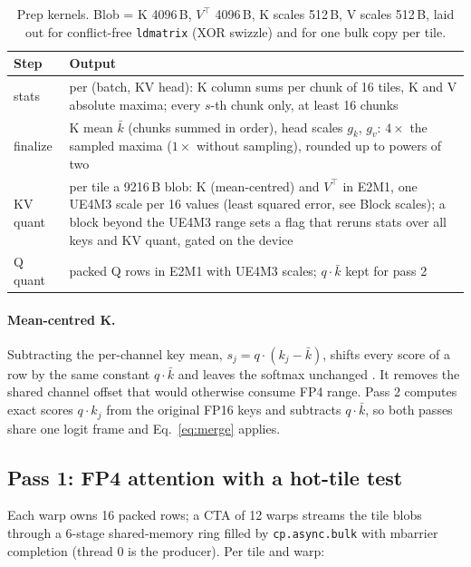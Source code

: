 \documentclass[10pt,twocolumn]{article}
\newcommand{\code}[1]{\texttt{#1}}
\begin{document}
\begin{table}[t]
\centering\small
\begin{tabular}{@{}lp{}@{}}
\toprule
Step & Output \\
\midrule
stats & per (batch, KV head): K column sums per chunk of 16 tiles, K and V absolute maxima; every $s$-th chunk
  only, at least 16 chunks \\
finalize & K mean $\bar k$ (chunks summed in order), head scales $g_k$, $g_v$: $4\times$ the sampled maxima ($1\times$
  without sampling), rounded up to powers of two \\
KV quant & per tile a 9216\,B blob: K (mean-centred) and $V^\top$ in E2M1, one UE4M3 scale per 16 values (least
  squared error, see Block scales); a block beyond the UE4M3 range sets a flag that reruns stats over all
  keys and KV quant, gated on the device \\
Q quant & packed Q rows in E2M1 with UE4M3 scales; $q\cdot\bar k$ kept for pass 2 \\
\bottomrule
\end{tabular}
\caption{Prep kernels. Blob = K 4096\,B, $V^\top$ 4096\,B, K scales 512\,B, V scales 512\,B, laid out for
conflict-free \code{ldmatrix} (XOR swizzle) and for one bulk copy per tile.}
\label{tab:prep}
\end{table}

\paragraph{Mean-centred K.} Subtracting the per-channel key mean, $s_j=q\cdot(k_j-\bar k)$, shifts every
score of a row by the same constant $q\cdot\bar k$ and leaves the softmax unchanged
\cite{zhang2025sageattention}. It removes the shared channel offset that would otherwise consume FP4 range.
Pass 2 computes exact scores $q\cdot k_j$ from the original FP16 keys and subtracts $q\cdot\bar k$, so both
passes share one logit frame and Eq.~\eqref{eq:merge} applies.

\subsection{Pass 1: FP4 attention with a hot-tile test}
\label{sec:hot}

Each warp owns 16 packed rows; a CTA of 12 warps streams the tile blobs through a 6-stage shared-memory ring
filled by \code{cp.async.bulk} with mbarrier completion (thread 0 is the producer). Per tile and warp:
\end{document}
